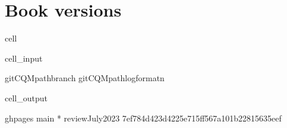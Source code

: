 \documentclass[letterpaper,table,10pt,english]{jupyterBook}
\begin{document}
\section{Book versions}
\label{\detokenize{tests/build_versions_checks:book-versions}}
\begin{sphinxuseclass}{cell}\begin{sphinxVerbatimInput}

\begin{sphinxuseclass}{cell_input}
\begin{sphinxVerbatim}[commandchars=\\\{\}]
  
git\PYGZhy{}CQMpathbranch
git\PYGZhy{}CQMpathlog\PYGZhy{}\PYGZhy{}format\PYGZhy{}n
\end{sphinxVerbatim}

\end{sphinxuseclass}\end{sphinxVerbatimInput}
\begin{sphinxVerbatimOutput}

\begin{sphinxuseclass}{cell_output}
\begin{sphinxVerbatim}[commandchars=\\\{\}]
  gh\PYGZhy{}pages
  main
* 
  reviewJuly2023
7ef784d423d4225e715ff567a101b22815635eef
\end{sphinxVerbatim}

\end{sphinxuseclass}\end{sphinxVerbatimOutput}

\end{sphinxuseclass}
\end{document}
